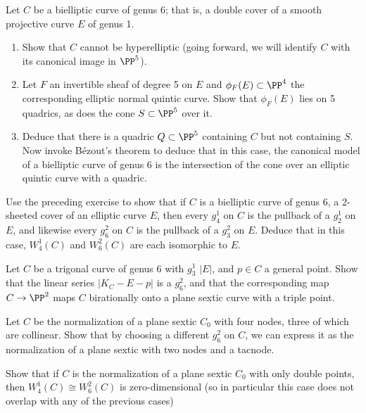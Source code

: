 \begin{exercise}
Let $C$ be a bielliptic curve of genus 6; that is, a double cover of a
%
smooth projective curve $E$ of genus 1.
\begin{enumerate}
\item Show that $C$ cannot be hyperelliptic (going forward, we will
identify $C$ with its canonical image in $\PP^5$).
\item Let $F$ an invertible sheaf of degree 5 on $E$ and $\phi_F(E)
\subset \PP^4$ the corresponding elliptic normal quintic curve. Show that
$\phi_F(E)$ lies on 5 quadrics, as does the cone $S \subset \PP^5$ over it.
\item Deduce that there is a quadric $Q \subset \PP^5$ containing $C$
but not containing $S$. Now invoke B\'ezout's theorem to deduce that in
this case, the canonical model of a bielliptic curve of genus 6 is the
intersection of the cone over an elliptic quintic curve with a quadric.
\end{enumerate}\label{tnih12.2}
\end{exercise}

\begin{exercise}
Use the preceding exercise to show that if $C$ is a bielliptic curve of
genus 6, a 2-sheeted cover of an elliptic curve $E$, then every $g^1_4$
on $C$ is the pullback of a $g^1_2$ on $E$, and likewise  every $g^2_6$
on $C$ is the pullback of a $g^2_3$ on $E$. Deduce that in this case,
$W^1_4(C)$ and $W^2_6(C)$ are each isomorphic to $E$.
\end{exercise}

\begin{exercise}
Let $C$ be a trigonal curve of genus 6 with $g^1_3$ $|E|$, and $p \in C$
a general point. Show that the linear series $|K_C - E-p|$ is a $g^2_6$,
and that the corresponding map $C \to \PP^2$ maps $C$ birationally onto
a plane sextic curve with a triple point.
\end{exercise}

\begin{exercise}\label{plane models}
Let $C$ be the normalization of a plane sextic $C_0$ with four nodes,
three of which are collinear. Show that by choosing a different $g^2_6$
on $C$, we can express it as the normalization of a plane sextic with
two nodes and a tacnode.
\unskip\break %
\null\hfill
{}
\end{exercise}

\begin{exercise}
Show that if $C$ is the normalization of a plane sextic $C_0$ with only
double points, then $W^1_4(C) \cong W^2_6(C)$ is zero-dimensional (so
in particular this case does not overlap with any of the previous cases)
\end{exercise}

